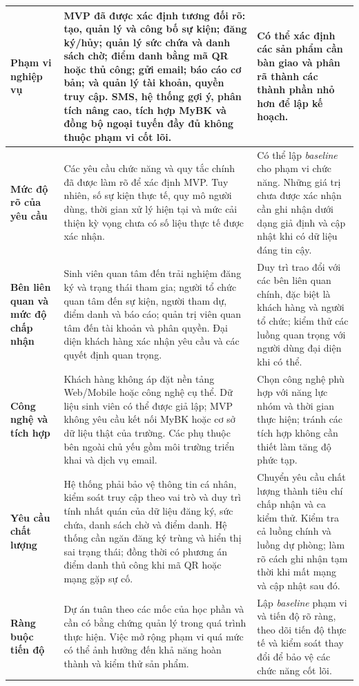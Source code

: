 {\begin{longtable}{|p{3.1cm}|p{6.1cm}|p{5.5cm}|}
\hline
\textbf{Phạm vi nghiệp vụ} & MVP đã được xác định tương đối rõ: tạo, quản lý và công bố sự kiện; đăng ký/hủy; quản lý sức chứa và danh sách chờ; điểm danh bằng mã QR hoặc thủ công; gửi email; báo cáo cơ bản; và quản lý tài khoản, quyền truy cập. SMS, hệ thống gợi ý, phân tích nâng cao, tích hợp MyBK và đồng bộ ngoại tuyến đầy đủ không thuộc phạm vi cốt lõi. & Có thể xác định các sản phẩm cần bàn giao và phân rã thành các thành phần nhỏ hơn để lập kế hoạch. \\
\hline
\textbf{Mức độ rõ của yêu cầu} & Các yêu cầu chức năng và quy tắc chính đã được làm rõ để xác định MVP. Tuy nhiên, số sự kiện thực tế, quy mô người dùng, thời gian xử lý hiện tại và mức cải thiện kỳ vọng chưa có số liệu thực tế được xác nhận. & Có thể lập \textit{baseline} cho phạm vi chức năng. Những giá trị chưa được xác nhận cần ghi nhận dưới dạng giả định và cập nhật khi có dữ liệu đáng tin cậy. \\
\hline
\textbf{Bên liên quan và mức độ chấp nhận} & Sinh viên quan tâm đến trải nghiệm đăng ký và trạng thái tham gia; người tổ chức quan tâm đến sự kiện, người tham dự, điểm danh và báo cáo; quản trị viên quan tâm đến tài khoản và phân quyền. Đại diện khách hàng xác nhận yêu cầu và các quyết định quan trọng. & Duy trì trao đổi với các bên liên quan chính, đặc biệt là khách hàng và người tổ chức; kiểm thử các luồng quan trọng với người dùng đại diện khi có thể. \\
\hline
\textbf{Công nghệ và tích hợp} & Khách hàng không áp đặt nền tảng Web/Mobile hoặc công nghệ cụ thể. Dữ liệu sinh viên có thể được giả lập; MVP không yêu cầu kết nối MyBK hoặc cơ sở dữ liệu thật của trường. Các phụ thuộc bên ngoài chủ yếu gồm môi trường triển khai và dịch vụ email. & Chọn công nghệ phù hợp với năng lực nhóm và thời gian thực hiện; tránh các tích hợp không cần thiết làm tăng độ phức tạp. \\
\hline
\textbf{Yêu cầu chất lượng} & Hệ thống phải bảo vệ thông tin cá nhân, kiểm soát truy cập theo vai trò và duy trì tính nhất quán của dữ liệu đăng ký, sức chứa, danh sách chờ và điểm danh. Hệ thống cần ngăn đăng ký trùng và hiển thị sai trạng thái; đồng thời có phương án điểm danh thủ công khi mã QR hoặc mạng gặp sự cố. & Chuyển yêu cầu chất lượng thành tiêu chí chấp nhận và ca kiểm thử. Kiểm tra cả luồng chính và luồng dự phòng; làm rõ cách ghi nhận tạm thời khi mất mạng và cập nhật sau đó. \\
\hline
\textbf{Ràng buộc tiến độ} & Dự án tuân theo các mốc của học phần và cần có bằng chứng quản lý trong quá trình thực hiện. Việc mở rộng phạm vi quá mức có thể ảnh hưởng đến khả năng hoàn thành và kiểm thử sản phẩm. & Lập \textit{baseline} phạm vi và tiến độ rõ ràng, theo dõi tiến độ thực tế và kiểm soát thay đổi để bảo vệ các chức năng cốt lõi. \\
\hline
\end{longtable}
}

